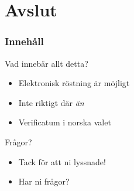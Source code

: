 \section{Avslut}
\begin{frame}
\frametitle{Innehåll}
\tableofcontents[currentsection]
\end{frame}

\begin{frame}{Vad innebär allt detta?}

\begin{itemize}
\item Elektronisk röstning är möjligt
\item Inte riktigt där \emph{än}
\item Verificatum i norska valet
\end{itemize}

\end{frame}

\begin{frame}{Frågor?}

\begin{itemize}
\item Tack för att ni lyssnade!
\item Har ni frågor?
\end{itemize}

\end{frame}
